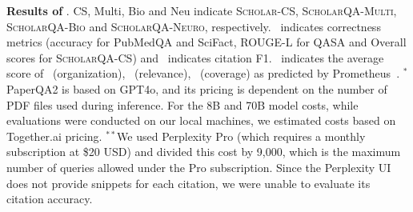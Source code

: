 \begin{table}[t!]
{    }
\caption{{\bf Results of \data}. CS, Multi, Bio and Neu indicate \textsc{Scholar-CS}, \textsc{ScholarQA-Multi}, \textsc{ScholarQA-Bio} and \textsc{ScholarQA-Neuro}, respectively. 
\acc~indicates correctness metrics (accuracy for PubMedQA and SciFact, ROUGE-L for QASA and Overall scores for \textsc{ScholarQA-CS}) and \cit~indicates citation F1. \llm~indicates the average score of \org~(organization), \rel~(relevance), \cov~(coverage) as predicted by Prometheus~\citep{kim2024prometheus}. $^*$PaperQA2 is based on GPT4o, and its pricing is dependent on the number of PDF files used during inference. 
For the 8B and 70B model costs, while evaluations were conducted on our local machines, we estimated costs based on Together.ai pricing.
$^{**}$We used Perplexity Pro (which requires a monthly subscription at \$20 USD) and divided this cost by 9,000, which is the maximum number of queries allowed under the Pro subscription. 
Since the Perplexity UI does not provide snippets for each citation, we were unable to evaluate its citation accuracy. 
}
\label{table:result_multi}
\end{table}%
\begin{table}
\small
    \centering
\caption{{\bf Statistics of hallucinated papers in computer science and biomedicine domains}. Our analysis revealed a significant number of non-existent cited papers in predictions made by LLMs without retrieval, which is a problem not observed in \model.}\label{table:result_non_parametric}
\end{table}
